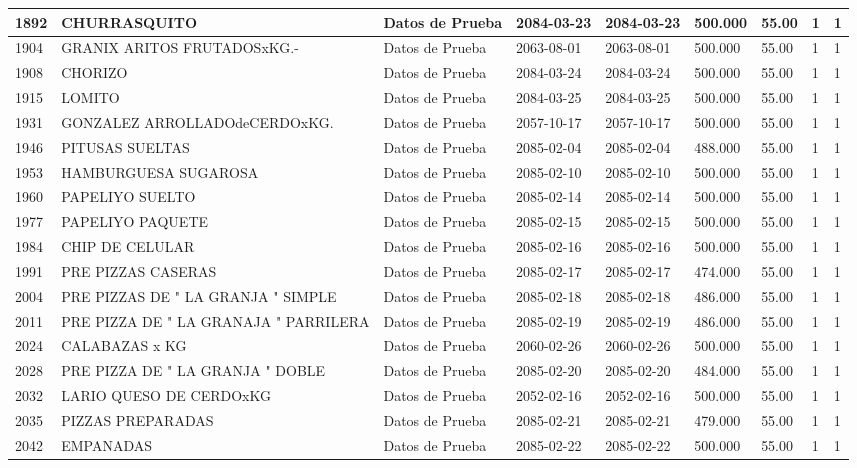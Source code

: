 \documentclass[a4paper,12pt]{article}
\begin{document}
\begin{landscape}
\begin{longtable}{|p{4cm}|p{2.5cm}|p{2.5cm}|p{1.8cm}|p{1.8cm}|p{1cm}|p{1cm}|p{3cm}|p{3cm}||}
1892 & CHURRASQUITO & Datos de Prueba & 2084-03-23 & 2084-03-23 & 500.000 & 55.00 & 1 & 1 \\ \hline 
1904 & GRANIX ARITOS FRUTADOSxKG.- & Datos de Prueba & 2063-08-01 & 2063-08-01 & 500.000 & 55.00 & 1 & 1 \\ \hline 
1908 & CHORIZO & Datos de Prueba & 2084-03-24 & 2084-03-24 & 500.000 & 55.00 & 1 & 1 \\ \hline 
1915 & LOMITO & Datos de Prueba & 2084-03-25 & 2084-03-25 & 500.000 & 55.00 & 1 & 1 \\ \hline 
1931 & GONZALEZ ARROLLADOdeCERDOxKG. & Datos de Prueba & 2057-10-17 & 2057-10-17 & 500.000 & 55.00 & 1 & 1 \\ \hline 
1946 & PITUSAS SUELTAS & Datos de Prueba & 2085-02-04 & 2085-02-04 & 488.000 & 55.00 & 1 & 1 \\ \hline 
1953 & HAMBURGUESA   SUGAROSA & Datos de Prueba & 2085-02-10 & 2085-02-10 & 500.000 & 55.00 & 1 & 1 \\ \hline 
1960 & PAPELIYO   SUELTO & Datos de Prueba & 2085-02-14 & 2085-02-14 & 500.000 & 55.00 & 1 & 1 \\ \hline 
1977 & PAPELIYO   PAQUETE & Datos de Prueba & 2085-02-15 & 2085-02-15 & 500.000 & 55.00 & 1 & 1 \\ \hline 
1984 & CHIP  DE  CELULAR & Datos de Prueba & 2085-02-16 & 2085-02-16 & 500.000 & 55.00 & 1 & 1 \\ \hline 
1991 & PRE  PIZZAS   CASERAS & Datos de Prueba & 2085-02-17 & 2085-02-17 & 474.000 & 55.00 & 1 & 1 \\ \hline 
2004 & PRE PIZZAS  DE "  LA GRANJA "  SIMPLE & Datos de Prueba & 2085-02-18 & 2085-02-18 & 486.000 & 55.00 & 1 & 1 \\ \hline 
2011 & PRE PIZZA  DE " LA GRANAJA "   PARRILERA & Datos de Prueba & 2085-02-19 & 2085-02-19 & 486.000 & 55.00 & 1 & 1 \\ \hline 
2024 & CALABAZAS x KG & Datos de Prueba & 2060-02-26 & 2060-02-26 & 500.000 & 55.00 & 1 & 1 \\ \hline 
2028 & PRE PIZZA   DE  " LA  GRANJA "  DOBLE & Datos de Prueba & 2085-02-20 & 2085-02-20 & 484.000 & 55.00 & 1 & 1 \\ \hline 
2032 & LARIO QUESO DE CERDOxKG & Datos de Prueba & 2052-02-16 & 2052-02-16 & 500.000 & 55.00 & 1 & 1 \\ \hline 
2035 & PIZZAS   PREPARADAS & Datos de Prueba & 2085-02-21 & 2085-02-21 & 479.000 & 55.00 & 1 & 1 \\ \hline 
2042 & EMPANADAS & Datos de Prueba & 2085-02-22 & 2085-02-22 & 500.000 & 55.00 & 1 & 1 \\ \hline 

\end{longtable}
\end{landscape}
\end{document}
